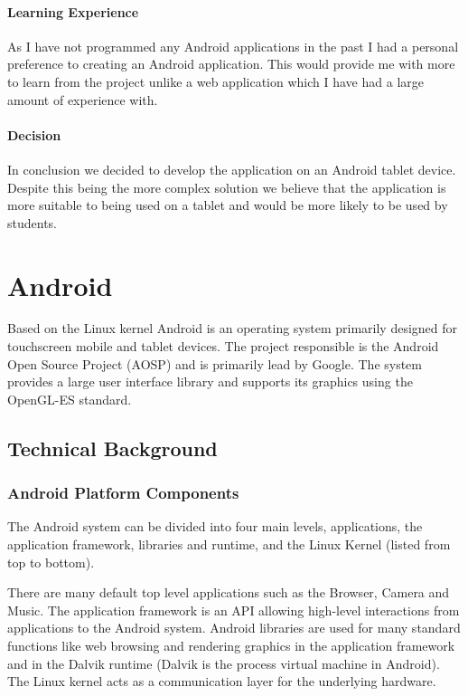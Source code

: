 \documentclass{report}
\begin{document}
\subsubsection{Learning Experience}

As I have not programmed any Android applications in the past I had a personal preference to creating an Android application. This would provide me with more to learn from the project unlike a web application which I have had a large amount of experience with.

\subsubsection{Decision}

In conclusion we decided to develop the application on an Android tablet device. Despite this being the more complex solution we believe that the application is more suitable to being used on a tablet and would be more likely to be used by students.

\chapter{Android}

Based on the Linux kernel Android is an operating system primarily designed for touchscreen mobile and tablet devices\cite{androidwiki}. The project responsible is the Android Open Source Project (AOSP) and is primarily lead by Google. The system provides a large user interface library and supports its graphics using the OpenGL-ES standard.

\section{Technical Background}

\subsection{Android Platform Components}

The Android system can be divided into four main levels, applications, the application framework, libraries and runtime, and the Linux Kernel (listed from top to bottom).

There are many default top level applications such as the Browser, Camera and Music. The application framework is an API allowing high-level interactions from applications to the Android system. Android libraries are used for many standard functions like web browsing and rendering graphics in the application framework and in the Dalvik runtime (Dalvik is the process virtual machine in Android). The Linux kernel acts as a communication layer for the underlying hardware.
\end{document}
